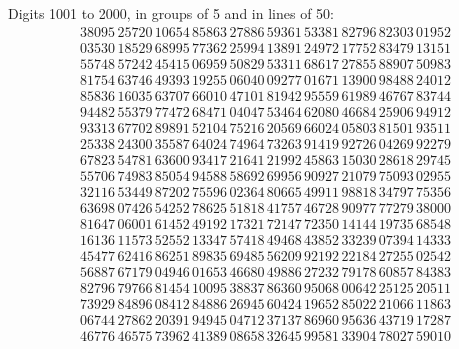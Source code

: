 \documentclass{article}
\begin{document}
\newpage

{\Large
Digits 1001 to 2000, in groups of 5 and in lines of 50:}
\LARGE
\begin{align*}
&38095 \, 25720 \, 10654 \, 85863 \, 27886 \, 59361 \, 53381 \, 82796 \, 82303 \, 01952 \\
&03530 \, 18529 \, 68995 \, 77362 \, 25994 \, 13891 \, 24972 \, 17752 \, 83479 \, 13151 \\
&55748 \, 57242 \, 45415 \, 06959 \, 50829 \, 53311 \, 68617 \, 27855 \, 88907 \, 50983 \\
&81754 \, 63746 \, 49393 \, 19255 \, 06040 \, 09277 \, 01671 \, 13900 \, 98488 \, 24012 \\
&85836 \, 16035 \, 63707 \, 66010 \, 47101 \, 81942 \, 95559 \, 61989 \, 46767 \, 83744 \\
&94482 \, 55379 \, 77472 \, 68471 \, 04047 \, 53464 \, 62080 \, 46684 \, 25906 \, 94912 \\
&93313 \, 67702 \, 89891 \, 52104 \, 75216 \, 20569 \, 66024 \, 05803 \, 81501 \, 93511 \\
&25338 \, 24300 \, 35587 \, 64024 \, 74964 \, 73263 \, 91419 \, 92726 \, 04269 \, 92279 \\
&67823 \, 54781 \, 63600 \, 93417 \, 21641 \, 21992 \, 45863 \, 15030 \, 28618 \, 29745 \\
&55706 \, 74983 \, 85054 \, 94588 \, 58692 \, 69956 \, 90927 \, 21079 \, 75093 \, 02955 \\
&32116 \, 53449 \, 87202 \, 75596 \, 02364 \, 80665 \, 49911 \, 98818 \, 34797 \, 75356 \\
&63698 \, 07426 \, 54252 \, 78625 \, 51818 \, 41757 \, 46728 \, 90977 \, 77279 \, 38000 \\
&81647 \, 06001 \, 61452 \, 49192 \, 17321 \, 72147 \, 72350 \, 14144 \, 19735 \, 68548 \\
&16136 \, 11573 \, 52552 \, 13347 \, 57418 \, 49468 \, 43852 \, 33239 \, 07394 \, 14333 \\
&45477 \, 62416 \, 86251 \, 89835 \, 69485 \, 56209 \, 92192 \, 22184 \, 27255 \, 02542 \\
&56887 \, 67179 \, 04946 \, 01653 \, 46680 \, 49886 \, 27232 \, 79178 \, 60857 \, 84383 \\
&82796 \, 79766 \, 81454 \, 10095 \, 38837 \, 86360 \, 95068 \, 00642 \, 25125 \, 20511 \\
&73929 \, 84896 \, 08412 \, 84886 \, 26945 \, 60424 \, 19652 \, 85022 \, 21066 \, 11863 \\
&06744 \, 27862 \, 20391 \, 94945 \, 04712 \, 37137 \, 86960 \, 95636 \, 43719 \, 17287 \\
&46776 \, 46575 \, 73962 \, 41389 \, 08658 \, 32645 \, 99581 \, 33904 \, 78027 \, 59010
\end{align*}
\end{document}
